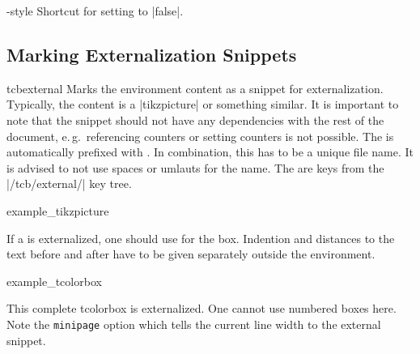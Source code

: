 \begin{extTcbKey}[][doc new and updated={2015-06-12}{2017-02-24}]{-}{}{style}
  Shortcut for setting  to |false|.
\end{extTcbKey}


\subsection{Marking Externalization Snippets}\label{subsec:external_marking}

\begin{docEnvironment}[doc new=2015-03-11]{tcbexternal}{}
Marks the environment content as a snippet for externalization.
Typically, the content is a |tikzpicture| or something similar.
It is important to note that the snippet should not have any dependencies
with the rest of the document, e.\,g.\ referencing counters or setting counters
is not possible.
The  is automatically prefixed with .
In combination, this has to be a unique file name. It is advised to not
use spaces or umlauts for the name.
The  are keys from the |/tcb/external/| key tree.

\begin{dispExample}
\begin{tcbexternal}{example_tikzpicture}
\end{tcbexternal}
\end{dispExample}

\medskip

If a  is externalized, one should use
 for the box. Indention and distances to
the text before and after have to be given separately outside the
 environment.

\begin{dispExample}
\noindent%
\begin{tcbexternal}[minipage]{example_tcolorbox}
  \begin{tcolorbox}[nobeforeafter,enhanced,
      fonttitle=\bfseries,title=Externalized Box,
      colframe=red!50!black,drop fuzzy shadow,
      interior style={fill overzoom image=goldshade.png}]
    This complete tcolorbox is externalized. One cannot use numbered
    boxes here. Note the \texttt{minipage} option which tells the
    current line width to the external snippet.
  \end{tcolorbox}
\end{tcbexternal}
\end{dispExample}


\end{docEnvironment}
